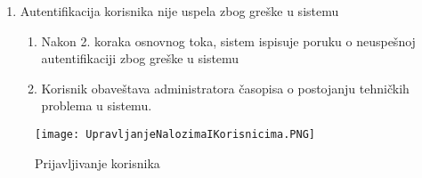 \documentclass[a4paper]{article}
\begin{document}
\begin{itemize}
\begin{enumerate}
\begin{enumerate}
                \end{enumerate}
            \item Autentifikacija korisnika nije uspela zbog greške u sistemu
                \begin{enumerate}
                    \item Nakon 2. koraka osnovnog toka, sistem ispisuje poruku o neuspešnoj autentifikaciji zbog greške u sistemu
                    \item Korisnik obaveštava administratora časopisa o postojanju tehničkih problema u sistemu.
                \end{enumerate}
        \end{enumerate}
\end{itemize}

\begin{figure}[hbt!]
    \centering
    \texttt{[image: UpravljanjeNalozimaIKorisnicima.PNG]}
    \caption{Prijavljivanje korisnika}
    \label{fig:my_label}
\end{figure}
\end{document}
